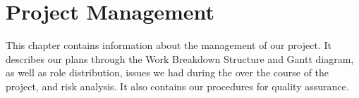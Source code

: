 \chapter{Project Management}
This chapter contains information about the management of our project. It describes our plans through the Work Breakdown Structure and Gantt diagram, as well as role distribution, issues we had during the over the course of the project, and risk analysis. It also contains our procedures for quality assurance.

